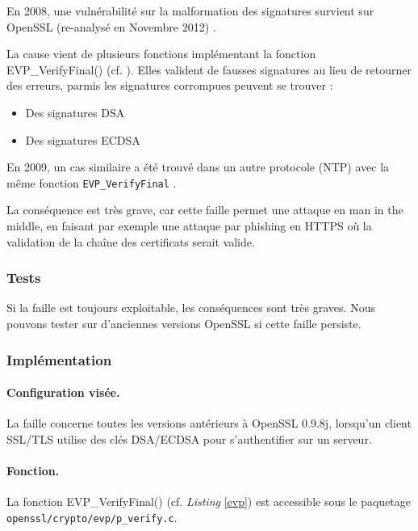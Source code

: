 		En 2008, une vulnérabilité sur la malformation des signatures survient sur OpenSSL (re-analysé en Novembre 2012) \cite{openssl2009secadv} \cite{cve-2008-5077}. 

		La cause vient de plusieurs fonctions implémentant la fonction EVP\_VerifyFinal() (cf. \textit{}). Elles valident de fausses signatures au lieu de retourner des erreurs, parmis les signatures corrompues peuvent se trouver :
		\begin{itemize}
		\item Des signatures DSA
		\item Des signatures ECDSA
		\end{itemize}

		En 2009, un cas similaire a été trouvé dans un autre protocole (NTP) avec la même fonction \texttt{EVP\_VerifyFinal} \cite{cve-2009-0021}.

		La conséquence est très grave, car cette faille permet une attaque en man in the middle, en faisant par exemple une attaque par phishing en HTTPS où la validation de la chaîne des certificats serait valide.

		\subsubsection{Tests}

		Si la faille est toujours exploitable, les conséquences sont très graves. Nous pouvons tester sur d'anciennes versions OpenSSL si cette faille persiste.
		
		\subsubsection{Implémentation}
			
			\paragraph{Configuration visée.\\}
			
			La faille concerne toutes les versions antérieurs à OpenSSL 0.9.8j, lorsqu'un client SSL/TLS utilise des clés DSA/ECDSA pour s'authentifier sur un serveur. 

			\paragraph{Fonction.\\}
			La fonction EVP\_VerifyFinal() (cf. \textit{Listing} \ref{evp}) est accessible sous le paquetage \texttt{openssl/crypto/evp/p\_verify.c}.
		
